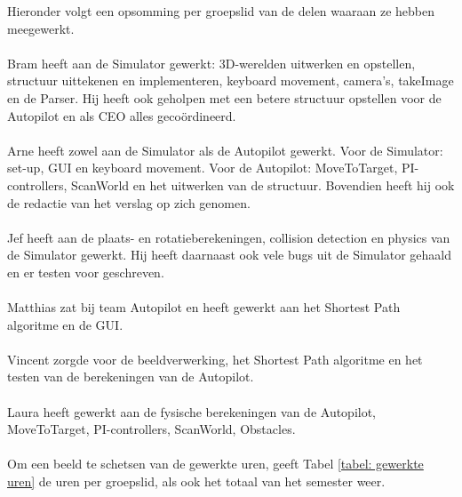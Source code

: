\documentclass[]{penoverslag}
\begin{document}
Hieronder volgt een opsomming per groepslid van de delen waaraan ze hebben meegewerkt.
\\
\\
Bram heeft aan de Simulator gewerkt: 3D-werelden uitwerken en opstellen, structuur uittekenen en implementeren, keyboard movement, camera's, takeImage en de Parser. Hij heeft ook geholpen met een betere structuur opstellen voor de Autopilot en als CEO alles geco\"ordineerd.
\\
\\
Arne heeft zowel aan de Simulator als de Autopilot gewerkt. Voor de Simulator: set-up, GUI en keyboard movement. Voor de Autopilot: MoveToTarget, PI-controllers, ScanWorld en het uitwerken van de structuur. Bovendien heeft hij ook de redactie van het verslag op zich genomen.
\\
\\
Jef heeft aan de plaats- en rotatieberekeningen, collision detection en physics van de Simulator gewerkt. Hij heeft daarnaast ook vele bugs uit de Simulator gehaald en er testen voor geschreven.
\\
\\
Matthias zat bij team Autopilot en heeft gewerkt aan het Shortest Path algoritme en de GUI.
\\
\\
Vincent zorgde voor de beeldverwerking, het Shortest Path algoritme en het testen van de berekeningen van de Autopilot.
\\
\\
Laura heeft gewerkt aan de fysische berekeningen van de Autopilot, MoveToTarget, PI-controllers, ScanWorld, Obstacles.
\\
\\
Om een beeld te schetsen van de gewerkte uren, geeft Tabel \ref{tabel: gewerkte uren} de uren per groepslid, als ook het totaal van het semester weer.
\\
\\
\end{document}
